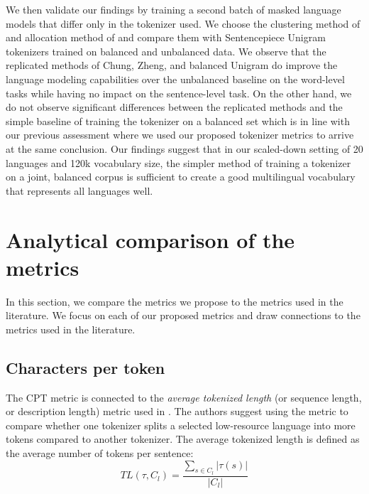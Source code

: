 We then validate our findings by training a second batch of masked language models that differ only in the tokenizer used. We choose the clustering method of \citet{chung_improving_2020} and allocation method of \citet{zheng_allocating_2021} and compare them with Sentencepiece Unigram tokenizers trained on balanced and unbalanced data. We observe that the replicated methods of Chung, Zheng, and balanced Unigram do improve the language modeling capabilities over the unbalanced baseline on the word-level tasks while having no impact on the sentence-level task. On the other hand, we do not observe significant differences between the replicated methods and the simple baseline of training the tokenizer on a balanced set which is in line with our previous assessment where we used our proposed tokenizer metrics to arrive at the same conclusion. Our findings suggest that in our scaled-down setting of 20 languages and 120k vocabulary size, the simpler method of training a tokenizer on a joint, balanced corpus is sufficient to create a good multilingual vocabulary that represents all languages well.

\section{Analytical comparison of the metrics}
\label{sec:metric_comparison}

In this section, we compare the metrics we propose to the metrics used in the literature. We focus on each of our proposed metrics and draw connections to the metrics used in the literature.

\subsection{Characters per token}

The CPT metric is connected to the \textit{average tokenized length} (or sequence length, or description length) metric used in \citet{chung_improving_2020,liang_xlm-v_2023}. The authors suggest using the metric to compare whether one tokenizer splits a selected low-resource language into more tokens compared to another tokenizer. The average tokenized length is defined as the average number of tokens per sentence: 
\begin{equation}
\label{eq:tl_def}
    TL(\tau, C_l) = \frac{\sum_{s \in C_l}|\tau(s)|}{|C_l|}
\end{equation}

